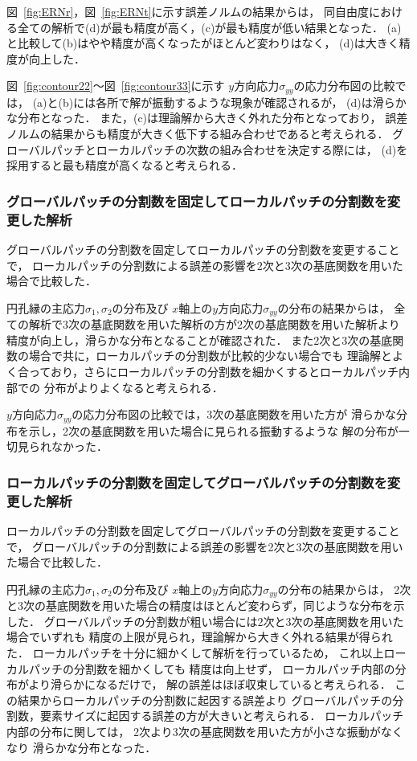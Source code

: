 図~\ref{fig:ERNr}，図~\ref{fig:ERNt}に示す誤差ノルムの結果からは，
同自由度における全ての解析で(d)が最も精度が高く，(c)が最も精度が低い結果となった．
(a)と比較して(b)はやや精度が高くなったがほとんど変わりはなく，
(d)は大きく精度が向上した．

図~\ref{fig:contour22}～図~\ref{fig:contour33}に示す
$y$方向応力$\sigma_{yy}$の応力分布図の比較では，
(a)と(b)には各所で解が振動するような現象が確認されるが，
(d)は滑らかな分布となった．
また，(c)は理論解から大きく外れた分布となっており，
誤差ノルムの結果からも精度が大きく低下する組み合わせであると考えられる．
グローバルパッチとローカルパッチの次数の組み合わせを決定する際には，
(d)を採用すると最も精度が高くなると考えられる．

\newpage

\subsubsection{グローバルパッチの分割数を固定してローカルパッチの分割数を変更した解析}
グローバルパッチの分割数を固定してローカルパッチの分割数を変更することで，
ローカルパッチの分割数による誤差の影響を2次と3次の基底関数を用いた場合で比較した．

円孔縁の主応力$\sigma_1,\sigma_2$の分布及び
$x$軸上の$y$方向応力$\sigma_{yy}$の分布の結果からは，
全ての解析で3次の基底関数を用いた解析の方が2次の基底関数を用いた解析より
精度が向上し，滑らかな分布となることが確認された．
また2次と3次の基底関数の場合で共に，ローカルパッチの分割数が比較的少ない場合でも
理論解とよく合っており，さらにローカルパッチの分割数を細かくするとローカルパッチ内部での
分布がよりよくなると考えられる．

$y$方向応力$\sigma_{yy}$の応力分布図の比較では，3次の基底関数を用いた方が
滑らかな分布を示し，2次の基底関数を用いた場合に見られる振動するような
解の分布が一切見られなかった．

\subsubsection{ローカルパッチの分割数を固定してグローバルパッチの分割数を変更した解析}
ローカルパッチの分割数を固定してグローバルパッチの分割数を変更することで，
グローバルパッチの分割数による誤差の影響を2次と3次の基底関数を用いた場合で比較した．

円孔縁の主応力$\sigma_1,\sigma_2$の分布及び
$x$軸上の$y$方向応力$\sigma_{yy}$の分布の結果からは，
2次と3次の基底関数を用いた場合の精度はほとんど変わらず，同じような分布を示した．
グローバルパッチの分割数が粗い場合には2次と3次の基底関数を用いた場合でいずれも
精度の上限が見られ，理論解から大きく外れる結果が得られた．
ローカルパッチを十分に細かくして解析を行っているため，
これ以上ローカルパッチの分割数を細かくしても
精度は向上せず，
ローカルパッチ内部の分布がより滑らかになるだけで，
解の誤差はほぼ収束していると考えられる．
この結果からローカルパッチの分割数に起因する誤差より
グローバルパッチの分割数，要素サイズに起因する誤差の方が大きいと考えられる．
ローカルパッチ内部の分布に関しては，
2次より3次の基底関数を用いた方が小さな振動がなくなり
滑らかな分布となった．

